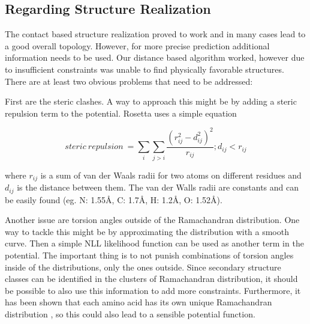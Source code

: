 \subsection{Regarding Structure Realization}

The contact based structure realization proved to work and in many cases lead to a good overall topology. However, for more precise prediction additional information needs to be used. Our distance based algorithm worked, however due to insufficient constraints was unable to find physically favorable structures. There are at least two obvious problems that need to be addressed:

First are the steric clashes. A way to approach this might be by adding a steric repulsion term to the potential. Rosetta \cite{rosetta} uses a simple equation

$$steric~repulsion~=\sum_{i} \sum_{j > i} \frac{(r_{ij}^2 - d_{ij}^2) ^ 2}{r_{ij}}; d_{ij} < r_{ij}$$

where $r_{ij}$ is a sum of van der Waals radii for two atoms on different residues and $d_{ij}$ is the distance between them. The van der Walls radii are constants and can be easily found (eg. N: 1.55\AA, C: 1.7\AA, H: 1.2\AA, O: 1.52\AA )\cite{vdw_radii}.

Another issue are torsion angles outside of the Ramachandran distribution. One way to tackle this might be by approximating the distribution with a smooth curve. Then a simple NLL likelihood function can be used as another term in the potential. The important thing is to not punish combinations of torsion angles inside of the distributions, only the ones outside. 
Since secondary structure classes can be identified in the clusters of Ramachandran distribution, it should be possible to also use this information to add more constraints. Furthermore, it has been shown that each amino acid has its own unique Ramachandran distribution \cite{rama_aa}, so this could also lead to a sensible potential function.